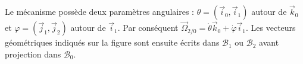 \begin{corrigebox}
Le mécanisme possède deux paramètres angulaires :
$\theta=(\vec i_0,\vec i_1)$ autour de $\vec k_0$ et
$\varphi=(\vec j_1,\vec j_2)$ autour de $\vec i_1$. Par conséquent
$\vec\Omega_{2/0}=\dot\theta\vec k_0+\dot\varphi\vec i_1$.
Les vecteurs géométriques indiqués sur la figure sont ensuite écrits dans
$\mathcal B_1$ ou $\mathcal B_2$ avant projection dans $\mathcal B_0$.
\end{corrigebox}
